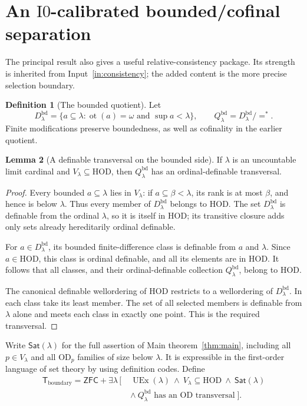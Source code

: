\documentclass[11pt,letterpaper]{article}
\theoremstyle{definition}
\newtheorem{definition}{Definition}[section]
\newtheorem{lemma}[definition]{Lemma}
\numberwithin{equation}{section}
\newcommand{\ZFC}{\mathsf{ZFC}}
\newcommand{\HOD}{\mathrm{HOD}}
\newcommand{\OD}{\mathrm{OD}}
\newcommand{\UEx}{\operatorname{UEx}}
\newcommand{\ot}{\operatorname{ot}}
\newcommand{\Izero}{\mathrm{I0}}
\newcommand{\Sat}{\mathsf{Sat}}
\newcommand{\bd}{\mathrm{bd}}
\newcommand{\eqfin}{\mathrel{=^{*}}}
\newcommand{\Tboundary}{\mathsf T_{\mathrm{boundary}}}
\begin{document}
\section{An \texorpdfstring{$\Izero$}{I0}-calibrated bounded/cofinal separation}\label{sec:consistency}

The principal result also gives a useful relative-consistency package. Its strength is inherited from Input~\ref{in:consistency}; the added content is the more precise selection boundary.

\begin{definition}[The bounded quotient]
Let
\[
 D_\lambda^{\bd}
  =\{a\subseteq\lambda:\ot(a)=\omega\text{ and }\sup a<\lambda\},
 \qquad Q_\lambda^{\bd}=D_\lambda^{\bd}/\eqfin.
\]
Finite modifications preserve boundedness, as well as cofinality in the earlier quotient.
\end{definition}

\begin{lemma}[A definable transversal on the bounded side]\label{lem:bounded}
If $\lambda$ is an uncountable limit cardinal and $V_\lambda\subseteq\HOD$, then $Q_\lambda^{\bd}$ has an ordinal-definable transversal.
\end{lemma}

\begin{proof}
Every bounded $a\subseteq\lambda$ lies in $V_\lambda$: if $a\subseteq\beta<\lambda$, its rank is at most $\beta$, and hence is below $\lambda$. Thus every member of $D_\lambda^{\bd}$ belongs to $\HOD$. The set $D_\lambda^{\bd}$ is definable from the ordinal $\lambda$, so it is itself in $\HOD$; its transitive closure adds only sets already hereditarily ordinal definable.

For $a\in D_\lambda^{\bd}$, its bounded finite-difference class is definable from $a$ and $\lambda$. Since $a\in\HOD$, this class is ordinal definable, and all its elements are in $\HOD$. It follows that all classes, and their ordinal-definable collection $Q_\lambda^{\bd}$, belong to $\HOD$.

The canonical definable wellordering of $\HOD$ restricts to a wellordering of $D_\lambda^{\bd}$. In each class take its least member. The set of all selected members is definable from $\lambda$ alone and meets each class in exactly one point. This is the required transversal.
\end{proof}

Write $\Sat(\lambda)$ for the full assertion of Main theorem~\ref{thm:main}, including all $p\in V_\lambda$ and all $\OD_p$ families of size below $\lambda$. It is expressible in the first-order language of set theory by using definition codes. Define
\begin{equation}\label{eq:Tboundary}
 \begin{split}
 \Tboundary=\ZFC+\exists\lambda\,[\;&\UEx(\lambda)
       \ \wedge\ V_\lambda\subseteq\HOD\ \wedge\ \Sat(\lambda)\\
       &\wedge\ \text{$Q_\lambda^{\bd}$ has an $\OD$ transversal}\;].
 \end{split}
\end{equation}
\end{document}
